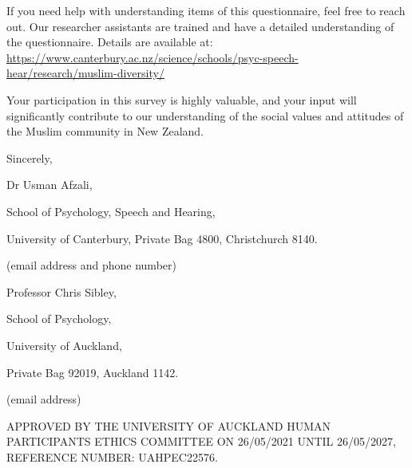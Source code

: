 \documentclass[
]{interact}
\begin{document}
\noindent If you need help with understanding items of this
questionnaire, feel free to reach out. Our researcher assistants are
trained and have a detailed understanding of the questionnaire. Details
are available at:
\url{https://www.canterbury.ac.nz/science/schools/psyc-speech-hear/research/muslim-diversity/}

\noindent Your participation in this survey is highly valuable, and your
input will significantly contribute to our understanding of the social
values and attitudes of the Muslim community in New Zealand.

\noindent Sincerely,

Dr Usman Afzali,

School of Psychology, Speech and Hearing,

University of Canterbury, Private Bag 4800, Christchurch 8140.

(email address and phone number)

Professor Chris Sibley,

School of Psychology,

University of Auckland,

Private Bag 92019, Auckland 1142.

(email address)

\noindent APPROVED BY THE UNIVERSITY OF AUCKLAND HUMAN PARTICIPANTS
ETHICS COMMITTEE ON 26/05/2021 UNTIL 26/05/2027, REFERENCE NUMBER:
UAHPEC22576.
\end{document}
